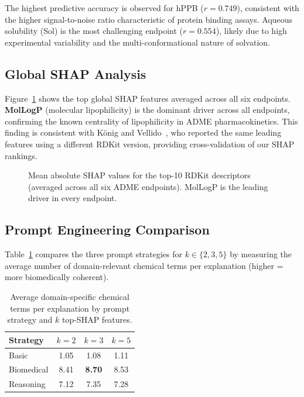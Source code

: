 \documentclass[a4paper, 11pt]{article}
\begin{document}
The highest predictive accuracy is observed for hPPB ($r = 0.749$),
consistent with the higher signal-to-noise ratio characteristic of protein
binding assays. Aqueous solubility (Sol) is the most challenging endpoint
($r = 0.554$), likely due to high experimental variability and the
multi-conformational nature of solvation.

\subsection{Global SHAP Analysis}

Figure~\ref{fig:global_shap} shows the top global SHAP features averaged
across all six endpoints. \textbf{MolLogP} (molecular lipophilicity) is
the dominant driver across all endpoints, confirming the known centrality
of lipophilicity in ADME pharmacokinetics. This finding is consistent with
König and Vellido~\cite{konig2024adme}, who reported the same leading
features using a different RDKit version, providing cross-validation of our
SHAP rankings.

\begin{figure}[H]
  \centering
  \caption{Mean absolute SHAP values for the top-10 RDKit descriptors
    (averaged across all six ADME endpoints). MolLogP is the leading driver
    in every endpoint.}
  \label{fig:global_shap}
\end{figure}

\subsection{Prompt Engineering Comparison}

Table~\ref{tab:prompt} compares the three prompt strategies for $k \in
\{2,3,5\}$ by measuring the average number of domain-relevant chemical
terms per explanation (higher = more biomedically coherent).

\begin{table}[H]
  \centering
  \caption{Average domain-specific chemical terms per explanation by
    prompt strategy and $k$ top-SHAP features.}
  \label{tab:prompt}
  \begin{tabular}{lccc}
    \toprule
    \textbf{Strategy} & \textbf{$k=2$} & \textbf{$k=3$} & \textbf{$k=5$} \\
    \midrule
    Basic        & 1.05 & 1.08 & 1.11 \\
    Biomedical   & 8.41 & \textbf{8.70} & 8.53 \\
    Reasoning    & 7.12 & 7.35 & 7.28 \\
    \bottomrule
  \end{tabular}
\end{table}
\end{document}
